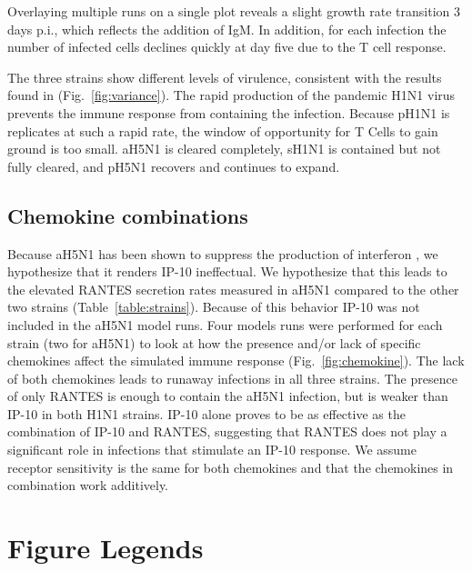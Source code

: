 \documentclass[10pt]{article}
\begin{document}
Overlaying multiple runs on a single plot reveals a slight growth rate transition 3 days p.i., which reflects the addition of IgM.  In addition, for each infection the number of infected cells declines quickly at day five due to the T cell response. 

The three strains show different levels of virulence, consistent with the results found in \cite{Mitchell2011} (Fig.~\ref{fig:variance}).  The rapid production of the pandemic H1N1 virus prevents the immune response from containing the infection.  Because pH1N1 is replicates at such a rapid rate, the window of opportunity for T Cells to gain ground is too small.  aH5N1 is cleared completely, sH1N1 is contained but not fully cleared, and pH5N1 recovers and continues to expand.



\subsection{Chemokine combinations}

Because aH5N1 has been shown to suppress the production of interferon \cite{Mitchell2011}, we hypothesize that it renders IP-10 ineffectual.  We hypothesize that this leads to the elevated RANTES secretion rates measured in aH5N1 compared to the other two strains (Table~\ref{table:strains}).  Because of this behavior IP-10 was not included in the aH5N1 model runs.  Four models runs were performed for each strain (two for aH5N1) to look at how the presence and/or lack of specific chemokines affect the simulated immune response (Fig.~\ref{fig:chemokine}).  The lack of both chemokines leads to runaway infections in all three strains.  The presence of only RANTES is enough to contain the aH5N1 infection, but is weaker than IP-10 in both H1N1 strains.  IP-10 alone proves to be as effective as the combination of IP-10 and RANTES, suggesting that RANTES does not play a significant role in infections that stimulate an IP-10 response.  We assume receptor sensitivity is the same for both chemokines and that the chemokines in combination work additively.




\section*{Figure Legends}

\end{document}
